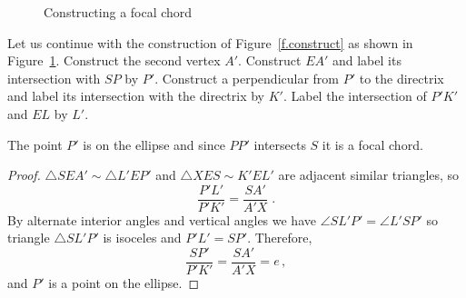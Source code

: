 \begin{figure}
\begin{center}
\end{center}
\caption{Constructing a focal chord}\label{f.focal-chord}
\end{figure}


Let us continue with the construction of Figure~\ref{f.construct} as shown in Figure~\ref{f.focal-chord}. Construct the second vertex $A'$. Construct $EA'$ and label its intersection with $SP$ by $P'$. Construct a perpendicular from $P'$ to the directrix and label its intersection with the directrix by $K'$. Label the intersection of $P'K'$ and $EL$ by $L'$.
\begin{theorem}
The point $P'$ is on the ellipse and since $PP'$ intersects $S$ it is a focal chord.
\end{theorem}
\begin{proof}
$\triangle SEA' \sim \triangle L'EP'$ and $\triangle XES\sim K'EL'$ are adjacent similar triangles, so
\[
\frac{P'L'}{P'K'}=\frac{SA'}{A'X}\;.
\]
By alternate interior angles and vertical angles we have $\angle SL'P'=\angle L'SP'$ so triangle $\triangle SL'P'$ is isoceles and $P'L'=SP'$. Therefore,
\[
\frac{SP'}{P'K'}=\frac{SA'}{A'X}=e\,,
\]
and $P'$ is a point on the ellipse.\hqed
\end{proof}


